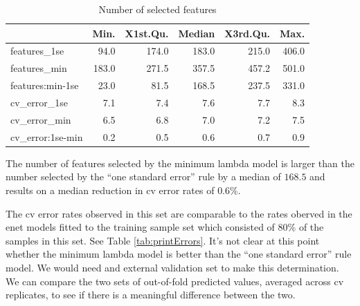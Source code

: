 \documentclass[
]{book}
\begin{document}
\begin{table}

\caption{\label{tab:hcc5hmC-glmnetSuiteB-model-size-enetAll}Number of selected features}
\centering
\begin{tabular}[t]{l|r|r|r|r|r}
\hline
  & Min. & X1st.Qu. & Median & X3rd.Qu. & Max.\\
\hline
features\_1se & 94.0 & 174.0 & 183.0 & 215.0 & 406.0\\
\hline
features\_min & 183.0 & 271.5 & 357.5 & 457.2 & 501.0\\
\hline
features:min-1se & 23.0 & 81.5 & 168.5 & 237.5 & 331.0\\
\hline
cv\_error\_1se & 7.1 & 7.4 & 7.6 & 7.7 & 8.3\\
\hline
cv\_error\_min & 6.5 & 6.8 & 7.0 & 7.2 & 7.5\\
\hline
cv\_error:1se-min & 0.2 & 0.5 & 0.6 & 0.7 & 0.9\\
\hline
\end{tabular}
\end{table}

The number of features selected by the minimum lambda model is larger
than the number selected by the ``one standard error'' rule by a median
of \(168.5\) and results on
a median reduction in cv error rates of
\(0.6\)\%.

The cv error rates observed in this set are comparable to the
rates oberved in the enet models fitted to the training sample set
which consisted of 80\% of the samples in this set. See Table \ref{tab:printErrors}.
It's not clear at this point whether the minimum lambda model is better than
the ``one standard error'' rule model. We would need and external validation
set to make this determination. We can compare the two sets
of out-of-fold predicted values, averaged across cv replicates, to see if
there is a meaningful difference between the two.
\end{document}
